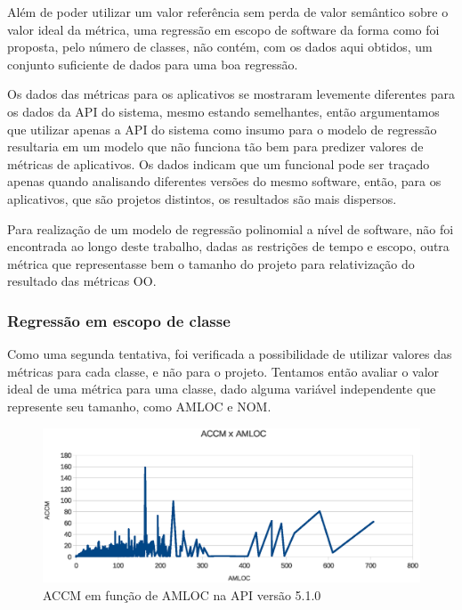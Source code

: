 Além de poder utilizar um valor referência sem perda de valor semântico sobre o valor ideal da métrica, uma regressão em escopo de software da forma como foi proposta, pelo número de classes, não contém, com os dados aqui obtidos, um conjunto suficiente de dados para uma boa regressão.

Os dados das métricas para os aplicativos se mostraram levemente diferentes para os dados da API do sistema, mesmo estando semelhantes, então argumentamos que utilizar apenas a API do sistema como insumo para o modelo de regressão resultaria em um modelo que não funciona tão bem para predizer valores de métricas de aplicativos. Os dados indicam que um funcional pode ser traçado apenas quando analisando diferentes versões do mesmo software, então, para os aplicativos, que são projetos distintos, os resultados são mais dispersos.

Para realização de um modelo de regressão polinomial a nível de software, não foi encontrada ao longo deste trabalho, dadas as restrições de tempo e escopo, outra métrica que representasse bem o tamanho do projeto para relativização do resultado das métricas OO. 

\subsubsection{Regressão em escopo de classe}

Como uma segunda tentativa, foi verificada a possibilidade de utilizar valores das métricas para cada classe, e não para o projeto. Tentamos então avaliar o valor ideal de uma métrica para uma classe, dado alguma variável independente que represente seu tamanho, como AMLOC e NOM.

\begin{figure}[!htb]
\centering
\includegraphics [keepaspectratio=true,scale=0.7]{figuras/accmxamloc510.eps}
\caption{ACCM em função de AMLOC na API versão 5.1.0}
\label{fig:accmxamloc510}
\end{figure}

